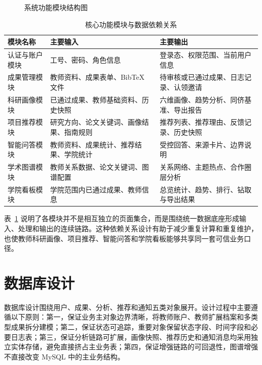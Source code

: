 \documentclass[12pt,a4paper]{ctexbook}
\begin{document}
\begin{figure}[H]
  \centering
  
  \caption{系统功能模块结构图}
  \label{fig:function-module}
\end{figure}

\begin{table}[H]
  \centering
  \small
  \caption{核心功能模块与数据依赖关系}
  \label{tab:module-dependencies}
  \begin{tabular}{p{3cm}p{3.3cm}p{5.2cm}}
    \toprule
    模块名称 & 主要输入 & 主要输出 \\
    \midrule
    认证与账户模块 & 工号、密码、角色信息 & 登录态、权限范围、当前用户信息 \\
    成果管理模块 & 教师资料、成果表单、BibTeX 文件 & 待审核或已通过成果、日志记录、认领邀请 \\
    科研画像模块 & 已通过成果、教师基础资料、历史快照 & 六维画像、趋势分析、同侪基准、导出报告 \\
    项目推荐模块 & 研究方向、论文关键词、画像结果、指南规则 & 推荐列表、推荐理由、反馈记录、历史快照 \\
    智能问答模块 & 教师资料、成果统计、推荐结果、学院统计 & 受控回答、来源卡片、边界说明 \\
    学术图谱模块 & 教师关系数据、论文关键词、图谱配置 & 关系网络、主题热点、合作圈层分析 \\
    学院看板模块 & 学院范围内已通过成果、教师信息 & 总览统计、趋势、排行、钻取与导出结果 \\
    \bottomrule
  \end{tabular}
\end{table}

表~\ref{tab:module-dependencies} 说明了各模块并不是相互独立的页面集合，而是围绕统一数据底座形成输入、处理和输出的连续链路。这种依赖关系设计有助于减少重复计算和重复维护，也使教师科研画像、项目推荐、智能问答和学院看板能够共享同一套可信业务口径。

\section{数据库设计}
数据库设计围绕用户、成果、分析、推荐和通知五类对象展开。设计过程中主要遵循以下原则：第一，保证业务主对象边界清晰，将教师账户、教师扩展档案和多类型成果拆分建模；第二，保证状态可追踪，重要对象保留状态字段、时间字段和必要日志表；第三，保证分析链路可扩展，画像快照、推荐历史和通知消息均采用独立实体存储，避免直接挤占主业务表；第四，保证增强链路的可回退性，图谱增强不直接改变 MySQL 中的主业务结构。
\end{document}
